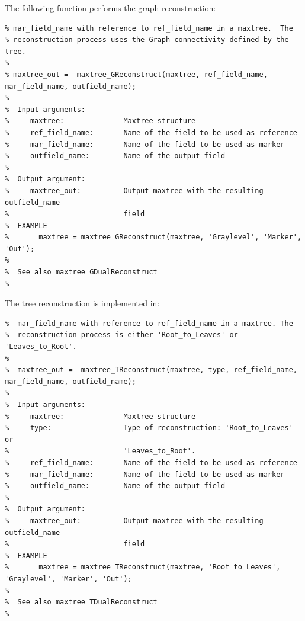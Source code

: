 \documentclass[DIV=calc, paper=a4, fontsize=11pt]{scrartcl}	 %
\begin{document}
The following function performs the graph reconstruction: 
\begin{lstlisting}[aboveskip=0.5 \baselineskip]
% maxtree_GReconstruct computes the morphological reconstruction of
% mar_field_name with reference to ref_field_name in a maxtree.  The
% reconstruction process uses the Graph connectivity defined by the tree.
%
% maxtree_out =  maxtree_GReconstruct(maxtree, ref_field_name, mar_field_name, outfield_name);
%
%  Input arguments:
%     maxtree:              Maxtree structure
%     ref_field_name:       Name of the field to be used as reference 
%     mar_field_name:       Name of the field to be used as marker 
%     outfield_name:        Name of the output field  
%
%  Output argument:
%     maxtree_out:          Output maxtree with the resulting outfield_name
%                           field
%  EXAMPLE 
%       maxtree = maxtree_GReconstruct(maxtree, 'Graylevel', 'Marker', 'Out');
%
%  See also maxtree_GDualReconstruct
%
\end{lstlisting}
The tree reconstruction is implemented in: 
\begin{lstlisting}[aboveskip=0.5 \baselineskip]
%  maxtree_TReconstruct computes the morphological Tree reconstruction of
%  mar_field_name with reference to ref_field_name in a maxtree. The
%  reconstruction process is either 'Root_to_Leaves' or 'Leaves_to_Root'.
%
%  maxtree_out =  maxtree_TReconstruct(maxtree, type, ref_field_name, mar_field_name, outfield_name);
%
%  Input arguments:
%     maxtree:              Maxtree structure
%     type:                 Type of reconstruction: 'Root_to_Leaves' or
%                           'Leaves_to_Root'.
%     ref_field_name:       Name of the field to be used as reference 
%     mar_field_name:       Name of the field to be used as marker 
%     outfield_name:        Name of the output field  
%
%  Output argument:
%     maxtree_out:          Output maxtree with the resulting outfield_name
%                           field
%  EXAMPLE 
%       maxtree = maxtree_TReconstruct(maxtree, 'Root_to_Leaves', 'Graylevel', 'Marker', 'Out');
%
%  See also maxtree_TDualReconstruct
%
\end{lstlisting}
\end{document}
